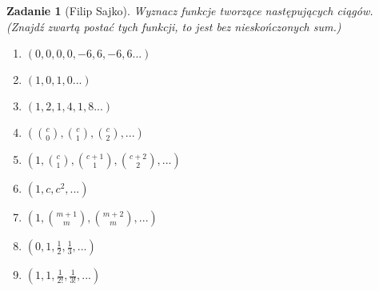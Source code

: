 \documentclass{mwart}
\newtheorem{zad}{Zadanie}[section]
\begin{document}
\begin{zad}[Filip Sajko]
    Wyznacz funkcje tworzące następujących ciągów. (Znajdź zwartą postać
    tych funkcji, to jest bez nieskończonych sum.)
    \begin{enumerate}
        \item$(0,0,0,0,-6,6,-6,6...)$
        \item$(1,0,1,0...)$
        \item $(1,2,1,4,1,8...)$
        \item $(\binom{c}{0}, \binom{c}{1}, \binom{c}{2}, ...)$
        \item $(1, \binom{c}{1}, \binom{c+1}{1}, \binom{c+2}{2}, ...)$
        \item $(1, c, c^2, ...)$
        \item $(1, \binom{m+1}{m}, \binom{m+2}{m},...)$
        \item $(0, 1, \frac{1}{2}, \frac{1}{3},...)$
        \item $(1, 1, \frac{1}{2!}, \frac{1}{3!},...)$
    \end{enumerate}
\end{zad}
\end{document}
